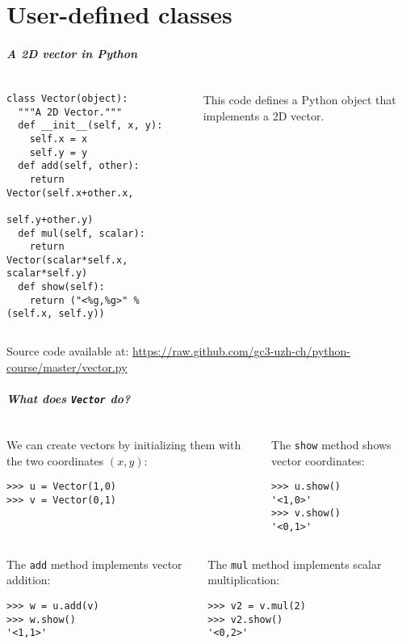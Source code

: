 \documentclass[english,serif,mathserif,xcolor=pdftex,dvipsnames,table]{beamer}
\begin{document}
\part{User-defined classes}

\begin{frame}[fragile]
  \frametitle{A \emph{2D vector} in Python}
  \begin{columns}[t]
    \begin{column}{0.5\textwidth}
\begin{lstlisting}
class Vector(object):
  """A 2D Vector."""
  def __init__(self, x, y):
    self.x = x
    self.y = y
  def add(self, other):
    return Vector(self.x+other.x,
                  self.y+other.y)
  def mul(self, scalar):
    return Vector(scalar*self.x, scalar*self.y)
  def show(self):
    return ("<%g,%g>" % (self.x, self.y))
\end{lstlisting}
    \end{column}
    \begin{column}{0.5\textwidth}
      \raggedleft
      This code defines a Python object that implements a 2D vector.
    \end{column}
  \end{columns}

  \+
  {\scriptsize Source code available at:
    \url{https://raw.github.com/gc3-uzh-ch/python-course/master/vector.py}}
\end{frame}


\begin{frame}[fragile]
  \frametitle{What does \texttt{Vector} do?}
  \begin{columns}
    \begin{column}[t]{0.5\linewidth}
  We can create vectors by initializing them with the two coordinates
  $(x,y)$:
\begin{lstlisting}
>>> u = Vector(1,0)
>>> v = Vector(0,1)
\end{lstlisting}
    \end{column}
    \begin{column}[t]{0.5\linewidth}
      The \texttt{show} method shows vector coordinates:
\begin{lstlisting}
>>> u.show()
'<1,0>'
>>> v.show()
'<0,1>'
\end{lstlisting}
    \end{column}
  \end{columns}

  \+
  \begin{columns}
    \begin{column}[t]{0.5\linewidth}
      The \texttt{add} method implements vector addition:
\begin{lstlisting}
>>> w = u.add(v)
>>> w.show()
'<1,1>'
\end{lstlisting}
    \end{column}
    \begin{column}[t]{0.5\linewidth}
      The \texttt{mul} method implements scalar multiplication:
\begin{lstlisting}
>>> v2 = v.mul(2)
>>> v2.show()
'<0,2>'
\end{lstlisting}
    \end{column}
  \end{columns}
\end{frame}
\end{document}
